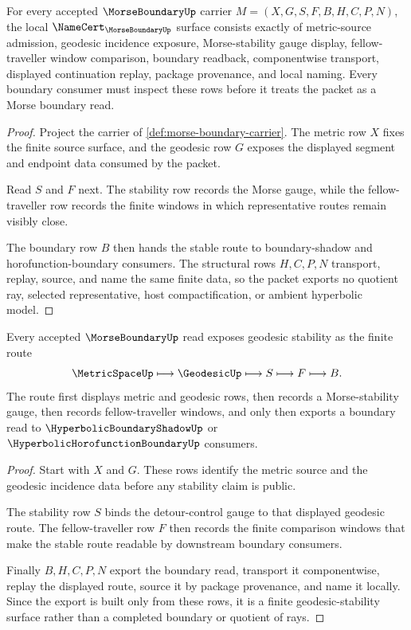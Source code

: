 \begin{theorem}
\label{thm:morse-boundary-namecert-obligations}
For every accepted $\MorseBoundaryUp$ carrier $M=(X,G,S,F,B,H,C,P,N)$, the local $\NameCert_{\MorseBoundaryUp}$ surface consists exactly of metric-source admission, geodesic incidence exposure, Morse-stability gauge display, fellow-traveller window comparison, boundary readback, componentwise transport, displayed continuation replay, package provenance, and local naming. Every boundary consumer must inspect these rows before it treats the packet as a Morse boundary read.
\end{theorem}
\begin{proof}
Project the carrier of \autoref{def:morse-boundary-carrier}. The metric row $X$ fixes the finite source surface, and the geodesic row $G$ exposes the displayed segment and endpoint data consumed by the packet.

Read $S$ and $F$ next. The stability row records the Morse gauge, while the fellow-traveller row records the finite windows in which representative routes remain visibly close.

The boundary row $B$ then hands the stable route to boundary-shadow and horofunction-boundary consumers. The structural rows $H,C,P,N$ transport, replay, source, and name the same finite data, so the packet exports no quotient ray, selected representative, host compactification, or ambient hyperbolic model.
\end{proof}

\begin{theorem}
\label{thm:morse-boundary-geodesic-stability}
Every accepted $\MorseBoundaryUp$ read exposes geodesic stability as the finite route
$$
\MetricSpaceUp \longmapsto \GeodesicUp \longmapsto S \longmapsto F \longmapsto B .
$$
The route first displays metric and geodesic rows, then records a Morse-stability gauge, then records fellow-traveller windows, and only then exports a boundary read to $\HyperbolicBoundaryShadowUp$ or $\HyperbolicHorofunctionBoundaryUp$ consumers.
\end{theorem}
\begin{proof}
Start with $X$ and $G$. These rows identify the metric source and the geodesic incidence data before any stability claim is public.

The stability row $S$ binds the detour-control gauge to that displayed geodesic route. The fellow-traveller row $F$ then records the finite comparison windows that make the stable route readable by downstream boundary consumers.

Finally $B,H,C,P,N$ export the boundary read, transport it componentwise, replay the displayed route, source it by package provenance, and name it locally. Since the export is built only from these rows, it is a finite geodesic-stability surface rather than a completed boundary or quotient of rays.
\end{proof}

